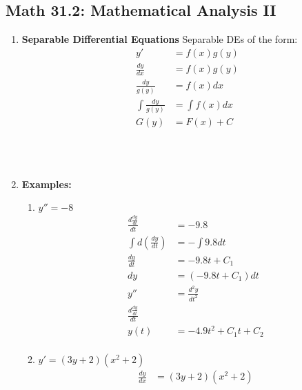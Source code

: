 \documentclass{article}
\begin{document}
\subsection*{Math 31.2: Mathematical Analysis II}
        \begin{enumerate}
            \item \textbf{Separable Differential Equations}
            Separable DEs of the form: \\
            \begin{align*}
                y'&=f(x)g(y) \\
                \frac{dy}{dx}&=f(x)g(y) \\
                \frac{dy}{g(y)}&=f(x)dx \\
                \int \frac{dy}{g(y)}&=\int f(x)dx \\
                G(y)&=F(x)+C \\\\\\\\\\\\\\\\\\
            \end{align*}
            \item \textbf{Examples:}
                \begin{enumerate}
                    \item \textit{$y''=-8$}
                        \begin{align*}
                            \frac{d\frac{dy}{dt}}{dt}&=-9.8 \\
                            \int d(\frac{dy}{dt})&=-\int9.8dt \\
                            \frac{dy}{dt}&=-9.8t+C_1 \\
                            dy&=(-9.8t+C_1)dt \\
                            y''&=\frac{d^2y}{dt^2} \\
                            \frac{d\frac{dy}{dt}}{dt} \\
                            y(t)&=-4.9t^2+C_1t+C_2 \\
                        \end{align*}
                    \item \textit{$y'=(3y+2)(x^2+2)$}
                        \begin{align*}
                            \frac{dy}{dx}&=(3y+2)(x^2+2) \\

\end{align*}
\end{enumerate}
\end{enumerate}
\end{document}
